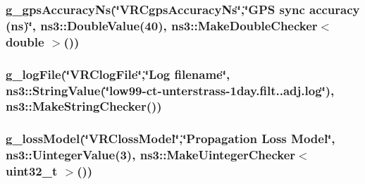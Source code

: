 \subsubsection[{\texorpdfstring{g\+\_\+gps\+Accuracy\+Ns}{g_gpsAccuracyNs}}]{ g\+\_\+gps\+Accuracy\+Ns(\char`\"{}V\+R\+Cgps\+Accuracy\+Ns\char`\"{},\char`\"{}G\+PS sync accuracy (ns)\char`\"{}, ns3\+::\+Double\+Value(40), {\bf ns3\+::\+Make\+Double\+Checker}$<$ double $>$())\hspace{0.3cm}{\ttfamily [static]}}\hypertarget{vanet-routing-compare_8cc_a4ee42facf395ec37f1603f17006d2a2b}{}\label{vanet-routing-compare_8cc_a4ee42facf395ec37f1603f17006d2a2b}
\subsubsection[{\texorpdfstring{g\+\_\+log\+File}{g_logFile}}]{ g\+\_\+log\+File(\char`\"{}V\+R\+Clog\+File\char`\"{},\char`\"{}Log filename\char`\"{}, ns3\+::\+String\+Value(\char`\"{}low99-\/ct-\/unterstrass-\/1day.\+filt..\+adj.\+log\char`\"{}), ns3\+::\+Make\+String\+Checker())\hspace{0.3cm}{\ttfamily [static]}}\hypertarget{vanet-routing-compare_8cc_a7b64f2511bc29448b2627be21efb5aa0}{}\label{vanet-routing-compare_8cc_a7b64f2511bc29448b2627be21efb5aa0}
\subsubsection[{\texorpdfstring{g\+\_\+loss\+Model}{g_lossModel}}]{ g\+\_\+loss\+Model(\char`\"{}V\+R\+Closs\+Model\char`\"{},\char`\"{}Propagation Loss Model\char`\"{}, ns3\+::\+Uinteger\+Value(3), {\bf ns3\+::\+Make\+Uinteger\+Checker}$<$ uint32\+\_\+t $>$())\hspace{0.3cm}{\ttfamily [static]}}\hypertarget{vanet-routing-compare_8cc_ad1c8112c8732013db7b1949f56a4a82d}{}\label{vanet-routing-compare_8cc_ad1c8112c8732013db7b1949f56a4a82d}
